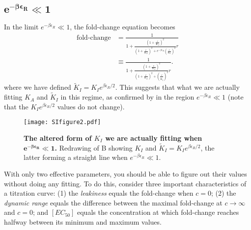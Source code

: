 \documentclass[10pt,letterpaper]{article}
\newcommand{\letter}[1]{#1} %
\newcommand \foldchange{\operatorname{fold-change}}
\begin{document}
\subsection{$\boldsymbol{e^{-\beta \epsilon_R} \ll 1}$}

In the limit $e^{-\beta \epsilon_R} \ll 1$, the fold-change equation becomes
\begin{align} \label{AppendixSloppinessEq2}
\foldchange &= \frac{1}{1+\frac{\left( 1 + \frac{c}{K_A} \right)^2}{\left( 1 + \frac{c}{K_A} \right)^2 + e^{-\beta \epsilon_R} \left(\frac{c}{K_I} \right)^2} r} \nonumber\\
&\equiv \frac{1}{1+\frac{\left( 1 + \frac{c}{K_A} \right)^2}{\left( 1 + \frac{c}{K_A} \right)^2 + \left(\frac{c}{\widetilde{K}_I} \right)^2} r}.
\end{align}
where we have defined $\widetilde{K}_I = K_I e^{\beta \epsilon_R/2}$. This
suggests that what we are actually fitting $K_A$ and $\widetilde{K}_I$ in this
regime, as confirmed by \fref[SIfig2] in the region $e^{-\beta \epsilon_R} \ll 1$ (note that the $K_I e^{\beta \epsilon_R/2}$ values do not change).
\begin{figure}[h]
	\centering \texttt{[image: SIfigure2.pdf]} \caption{{\bf The altered
			form of $K_I$ we are actually fitting when $\boldsymbol{e^{-\beta \epsilon_R}
				\ll 1}$.} Redrawing of \fref[SIfig1]\letter{B} showing $K_I$ and $\widetilde{K}_I
		= K_I e^{\beta \epsilon_R/2}$, the latter forming a straight line when
		$e^{-\beta \epsilon_R} \ll 1$.} \label{SIfig2}
\end{figure}

With only two effective parameters, you should be able to figure out their
values without doing any fitting. To do this, consider three important
characteristics of a titration curve: (1) the \textit{leakiness} equals the fold-change
when $c=0$; (2) the \textit{dynamic range} equals the difference between the maximal
fold-change at $c\to\infty$ and $c=0$; and $[EC_{50}]$ equals the concentration at
which fold-change reaches halfway between its minimum and maximum values.
\end{document}
